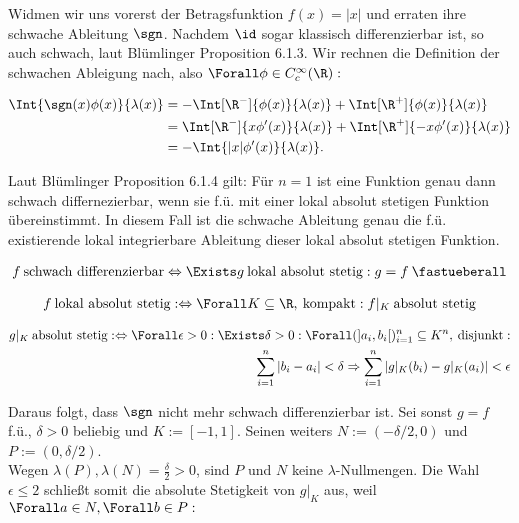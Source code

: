 \begin{solution}

Widmen wir uns vorerst der Betragsfunktion $f(x) = |x|$ und erraten ihre schwache Ableitung $\sgn$. Nachdem $\id$ sogar klassisch differenzierbar ist, so auch schwach, laut Blümlinger Proposition 6.1.3. Wir rechnen die Definition der schwachen Ableigung nach, also $\Forall \phi \in C_c^\infty(\R):$

\begin{align*}
  \Int{\sgn(x) \phi(x)}{\lambda(x)}
  & = - \Int[\R^-]{\phi(x)}{\lambda(x)}
      + \Int[\R^+]{\phi(x)}{\lambda(x)} \\
  & = \Int[\R^-]{x \phi^\prime(x)}{\lambda(x)} +
      \Int[\R^+]{-x \phi^\prime(x)}{\lambda(x)} \\
  & = - \Int{|x| \phi^\prime(x)}{\lambda(x)}.
\end{align*}

Laut Blümlinger Proposition 6.1.4 gilt: Für $n = 1$ ist eine Funktion genau dann schwach differnezierbar, wenn sie f.ü. mit einer lokal absolut stetigen Funktion übereinstimmt. In diesem Fall ist die schwache Ableitung genau die f.ü. existierende lokal integrierbare Ableitung dieser lokal absolut stetigen Funktion.

\begin{align*}
  f \: \text{schwach differenzierbar}
  \Leftrightarrow
  \Exists g \: \text{lokal absolut stetig}: g = f \: \fastueberall
\end{align*}

\begin{align*}
  f \: \text{lokal absolut stetig}
  : \Leftrightarrow
  \Forall K \subseteq \R, \: \text{kompakt}:
  f|_K \: \text{absolut stetig}
\end{align*}

\begin{align*}
  g|_K \: \text{absolut stetig}
  : \Leftrightarrow
  \Forall \epsilon > 0: \Exists \delta > 0:
  \Forall (]a_i, b_i[)_{i=1}^n \subseteq K^n, \: \text{disjunkt}: \\
  \sum_{i=1}^n |b_i - a_i| < \delta
  \Rightarrow
  \sum_{i=1}^n |g|_K(b_i) - g|_K(a_i)| < \epsilon
\end{align*}

Daraus folgt, dass $\sgn$ nicht mehr schwach differenzierbar ist. Sei sonst $g = f$ f.ü., $\delta > 0$ beliebig und $K := [-1, 1]$. Seinen weiters $N := (- \delta/2, 0)$ und $P := (0, \delta/2)$. \\

Wegen $\lambda(P), \lambda(N) = \frac{\delta}{2} > 0$, sind $P$ und $N$ keine $\lambda$-Nullmengen. Die Wahl $\epsilon \leq 2$ schließt somit die absolute Stetigkeit von $g|_K$ aus, weil $\Forall a \in N, \Forall b \in P:$


\end{solution}
